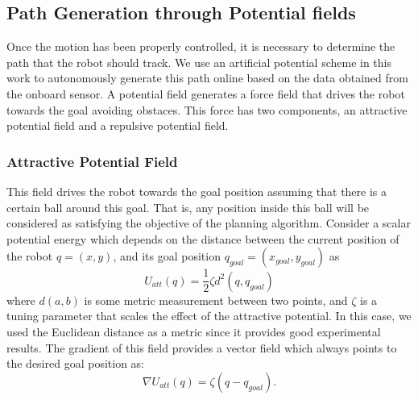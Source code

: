 \documentclass[conference]{IEEEtran}
\begin{document}
\subsection{Path Generation through Potential fields}
\label{sec:APF}

Once the motion has been properly controlled, it is necessary to determine the
path that the robot should track. We use an artificial potential scheme in this
work to autonomously generate this path online based on the data obtained from
the onboard sensor.
A potential field generates a force field that drives the robot towards the goal
avoiding obstaces. This force has two components, an attractive potential field
and a repulsive potential field.

\subsubsection{Attractive Potential Field}

This field drives the robot towards the goal position assuming that there is a
certain ball around this goal. That is, any position inside this ball will be
considered as satisfying the objective of the planning algorithm. Consider a
scalar potential energy which depends on the distance between the current
position of the robot $q=(x,y)$, and its goal position
$q_{goal}=(x_{goal},y_{goal})$ as
\begin{equation}
	U_{att}(q) = \frac{1}{2} \zeta d^2(q,q_{goal})
	\label{eq:pot_attr}
\end{equation}
where $d(a,b)$ is some metric measurement between two points, and $\zeta$ is a
tuning parameter that scales the effect of the attractive potential. In this
case, we used the Euclidean distance as a metric since it provides good
experimental results. The gradient of this field provides a vector field which
always points to the desired goal position as:
\begin{equation}
  \label{gradient_att}
    \nabla U_{att}(q)= \zeta(q - q_{goal}).
\end{equation}
\end{document}
